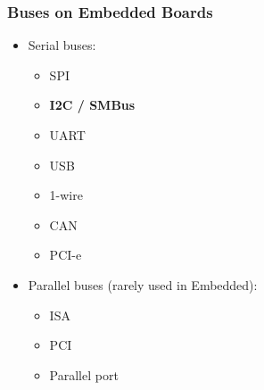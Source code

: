 \documentclass[aspectratio=169,usenames,dvipsnames]{beamer}
\begin{document}
\begin{frame}
  \frametitle{Buses on Embedded Boards}
  \begin{itemize}
    \item Serial buses:
      \begin{itemize}
        \item SPI
        \item \textbf{I2C / SMBus}
        \item UART
        \item USB
        \item 1-wire
        \item CAN
        \item PCI-e
      \end{itemize}
    \item Parallel buses (rarely used in Embedded):
      \begin{itemize}
        \item ISA
        \item PCI
        \item Parallel port
      \end{itemize}
  \end{itemize}
\end{frame}
\end{document}
